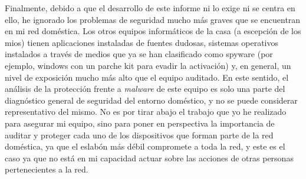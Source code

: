Finalmente, debido a que el desarrollo de este informe ni lo exige ni se centra en ello, he ignorado los problemas de seguridad mucho más graves que se encuentran en mi red doméstica. Los otros equipos informáticos de la casa (a escepción de los mios) tienen aplicaciones instaladas de fuentes dudosas, sistemas operativos instalados a través de medios que ya se han clasificado como spyware (por ejemplo, windows con un parche kit para evadir la activación) y, en general, un nivel de exposición mucho más alto que el equipo auditado. En este sentido, el análisis de la protección frente a \textit{malware} de este equipo es solo una parte del diagnóstico general de seguridad del entorno doméstico, y no se puede considerar representativo del mismo. No es por 
tirar abajo el trabajo que yo he realizado para asegurar mi equipo, sino para poner en perspectiva la importancia de auditar y proteger cada uno de los dispositivos que forman parte de la red doméstica, ya que el eslabón más débil compromete a toda la red, y este es el caso ya que no está en mi capacidad actuar sobre las acciones de otras personas pertenecientes a la red.
